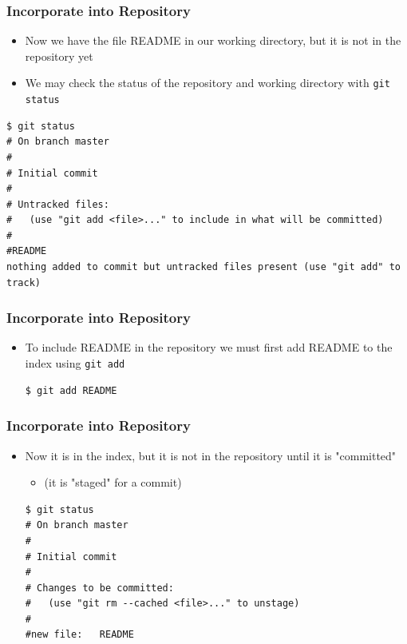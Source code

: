 \documentclass[12pt,t]{beamer}
\newcommand{\bi}{\begin{itemize}}
\newcommand{\bbi}{\vspace{24pt} \begin{itemize} \itemsep8pt}
\newcommand{\ei}{\end{itemize}}
\begin{document}
\begin{frame}[fragile]
\frametitle{Incorporate into Repository}
\bbi
\item Now we have the file README in our working directory, but it is not in the repository yet
\item We may check the status of the repository and working directory with \texttt{git status}
\ei
\begin{semiverbatim}
\begin{lstlisting}
$ git status
# On branch master
#
# Initial commit
#
# Untracked files:
#   (use "git add <file>..." to include in what will be committed)
#
#README
nothing added to commit but untracked files present (use "git add" to track)
\end{lstlisting}
\end{semiverbatim}

\end{frame}

\begin{frame}[fragile]
\frametitle{Incorporate into Repository}
\bbi
\item To include README in the repository we must first add README to the index using \texttt{git add}
\begin{semiverbatim}
\begin{lstlisting}
$ git add README 
\end{lstlisting}
\end{semiverbatim}
\ei
\end{frame}

\begin{frame}[fragile]
\frametitle{Incorporate into Repository}
\bbi
\item Now it is in the index, but it is not in the repository until it is "committed"
\bi
\item[] (it is "staged" for a commit)
\ei
\begin{semiverbatim}
\begin{lstlisting}
$ git status
# On branch master
#
# Initial commit
#
# Changes to be committed:
#   (use "git rm --cached <file>..." to unstage)
#
#new file:   README
\end{lstlisting}
\end{semiverbatim}
\ei
\end{frame}
\end{document}
